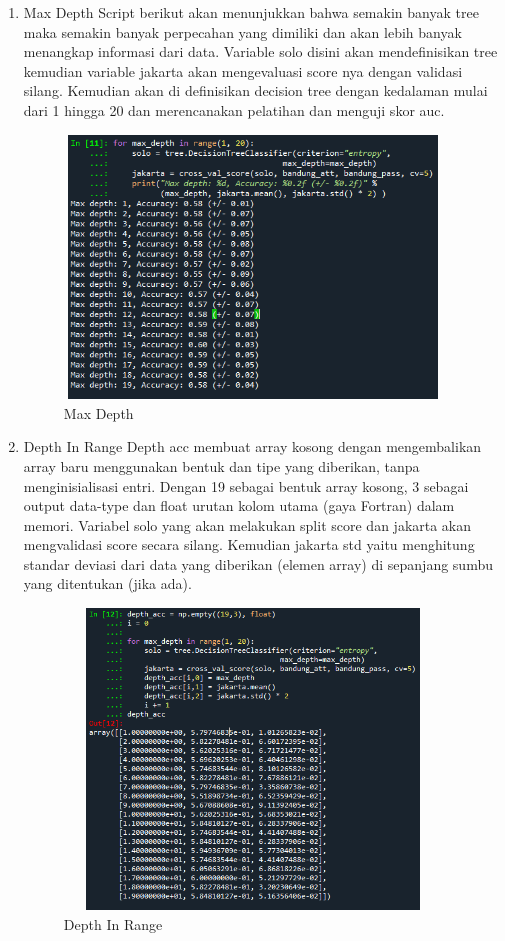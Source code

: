 \begin{enumerate}
\item Max Depth
\newline Script berikut akan menunjukkan bahwa semakin banyak tree maka semakin banyak perpecahan yang dimiliki dan akan lebih banyak menangkap informasi dari data. Variable solo disini akan mendefinisikan tree kemudian variable jakarta akan mengevaluasi score nya dengan validasi silang. Kemudian akan di definisikan decision tree dengan kedalaman mulai dari 1 hingga 20 dan
merencanakan pelatihan dan menguji skor auc.
\begin{figure}[!htbp]
	\centering
	\includegraphics[width=10cm,height=7cm]{figures/max_depth.png}
	\caption{Max Depth}
	\label{penanda}
\end{figure}

\item Depth In Range
\newline Depth acc membuat array kosong dengan mengembalikan array baru menggunakan bentuk dan tipe yang diberikan, tanpa menginisialisasi entri. Dengan 19 sebagai bentuk array kosong, 3 sebagai output data-type dan float urutan kolom utama (gaya Fortran) dalam memori. Variabel solo yang akan melakukan
split score dan jakarta akan mengvalidasi score secara silang. Kemudian jakarta std yaitu menghitung standar deviasi dari data yang diberikan (elemen array) di sepanjang sumbu yang ditentukan (jika ada).
\begin{figure}[!htbp]
	\centering
	\includegraphics[width=10cm,height=8cm]{figures/depth_range.png}
	\caption{Depth In Range}
	\label{penanda}
\end{figure}


\end{enumerate}
